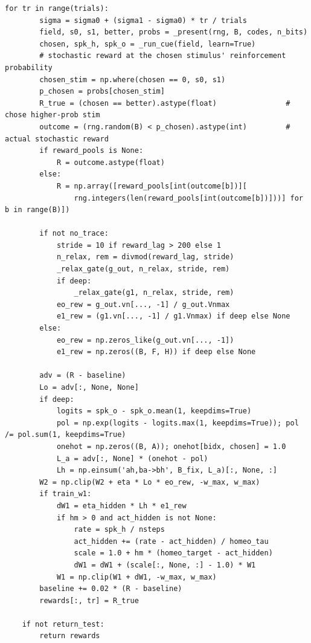 \begin{lstlisting}[caption={mrl\_trace/probselect.py},label={lst:siox-src-probselect}]
    for tr in range(trials):
        sigma = sigma0 + (sigma1 - sigma0) * tr / trials
        field, s0, s1, better, probs = _present(rng, B, codes, n_bits)
        chosen, spk_h, spk_o = _run_cue(field, learn=True)
        # stochastic reward at the chosen stimulus' reinforcement probability
        chosen_stim = np.where(chosen == 0, s0, s1)
        p_chosen = probs[chosen_stim]
        R_true = (chosen == better).astype(float)                # chose higher-prob stim
        outcome = (rng.random(B) < p_chosen).astype(int)         # actual stochastic reward
        if reward_pools is None:
            R = outcome.astype(float)
        else:
            R = np.array([reward_pools[int(outcome[b])][
                rng.integers(len(reward_pools[int(outcome[b])]))] for b in range(B)])

        if not no_trace:
            stride = 10 if reward_lag > 200 else 1
            n_relax, rem = divmod(reward_lag, stride)
            _relax_gate(g_out, n_relax, stride, rem)
            if deep:
                _relax_gate(g1, n_relax, stride, rem)
            eo_rew = g_out.vn[..., -1] / g_out.Vnmax
            e1_rew = (g1.vn[..., -1] / g1.Vnmax) if deep else None
        else:
            eo_rew = np.zeros_like(g_out.vn[..., -1])
            e1_rew = np.zeros((B, F, H)) if deep else None

        adv = (R - baseline)
        Lo = adv[:, None, None]
        if deep:
            logits = spk_o - spk_o.mean(1, keepdims=True)
            pol = np.exp(logits - logits.max(1, keepdims=True)); pol /= pol.sum(1, keepdims=True)
            onehot = np.zeros((B, A)); onehot[bidx, chosen] = 1.0
            L_a = adv[:, None] * (onehot - pol)
            Lh = np.einsum('ah,ba->bh', B_fix, L_a)[:, None, :]
        W2 = np.clip(W2 + eta * Lo * eo_rew, -w_max, w_max)
        if train_w1:
            dW1 = eta_hidden * Lh * e1_rew
            if hm > 0 and act_hidden is not None:
                rate = spk_h / nsteps
                act_hidden += (rate - act_hidden) / homeo_tau
                scale = 1.0 + hm * (homeo_target - act_hidden)
                dW1 = dW1 + (scale[:, None, :] - 1.0) * W1
            W1 = np.clip(W1 + dW1, -w_max, w_max)
        baseline += 0.02 * (R - baseline)
        rewards[:, tr] = R_true

    if not return_test:
        return rewards


\end{lstlisting}
